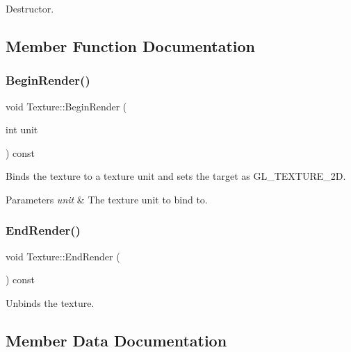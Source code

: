 Destructor.



\subsection{Member Function Documentation}
\hypertarget{class_texture_a6c9fda62e4203d0545ec0d3d0551760d}{}\label{class_texture_a6c9fda62e4203d0545ec0d3d0551760d}
\subsubsection{\texorpdfstring{Begin\+Render()}{BeginRender()}}
{\footnotesize\ttfamily void Texture\+::\+Begin\+Render (\begin{DoxyParamCaption}\item[{int}]{unit }\end{DoxyParamCaption}) const\hspace{0.3cm}{\ttfamily [virtual]}}



Binds the texture to a texture unit and sets the target as G\+L\+\_\+\+T\+E\+X\+T\+U\+R\+E\+\_\+2D.


\begin{DoxyParams}{Parameters}
{\em unit} & The texture unit to bind to. \\
\hline
\end{DoxyParams}
\hypertarget{class_texture_ab3fc771da58d58e1f3701b1fae12880b}{}\label{class_texture_ab3fc771da58d58e1f3701b1fae12880b}
\subsubsection{\texorpdfstring{End\+Render()}{EndRender()}}
{\footnotesize\ttfamily void Texture\+::\+End\+Render (\begin{DoxyParamCaption}{ }\end{DoxyParamCaption}) const\hspace{0.3cm}{\ttfamily [virtual]}}



Unbinds the texture.



\subsection{Member Data Documentation}
\hypertarget{class_texture_adbf320788255a426a0a60e35cd969bcd}{}\label{class_texture_adbf320788255a426a0a60e35cd969bcd}
